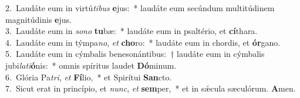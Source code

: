 {2.~}Laudáte eum in virtú\textit{ti}\textit{bus} \textbf{e}jus:~* laudáte eum secúndum multitúdinem magnitúdinis \textbf{e}jus.\\
{3.~}Laudáte eum in \textit{so}\textit{no} \textbf{tu}bæ:~* laudáte eum in psaltério, et \textbf{cí}thara.\\
{4.~}Laudáte eum in týmpa\textit{no}, \textit{et} \textbf{cho}ro:~* laudáte eum in chordis, et \textbf{ór}gano.\\
{5.~}Laudáte eum in cýmbalis benesonántibus:~† laudáte eum in cýmbalis jubi\textit{la}\textit{ti}\textbf{ó}nis:~* omnis spíritus laudet \textbf{Dó}minum.\\
{6.~}Glória Pa\textit{tri}, \textit{et} \textbf{Fí}lio,~* et Spirítui \textbf{San}cto.\\
{7.~}Sicut erat in princípio, et \textit{nunc}, \textit{et} \textbf{sem}per,~* et in sǽcula sæculórum. \textbf{A}men.\\
